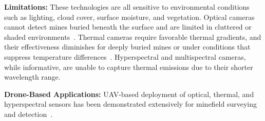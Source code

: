 \textbf{Limitations:} These technologies are all sensitive to environmental conditions such as lighting, cloud cover, surface moisture, and vegetation. Optical cameras cannot detect mines buried beneath the surface and are limited in cluttered or shaded environments~\cite{cardonalandmine}. Thermal cameras require favorable thermal gradients, and their effectiveness diminishes for deeply buried mines or under conditions that suppress temperature differences~\cite{Kovcs2022LandmineDW}. Hyperspectral and multispectral cameras, while informative, are unable to capture thermal emissions due to their shorter wavelength range.

\textbf{Drone-Based Applications:} UAV-based deployment of optical, thermal, and hyperspectral sensors has been demonstrated extensively for minefield surveying and detection~\cite{dena2020image,7529819,Schutte2001ARCAC,10.1117/12.2177182,Popov2022MethodFM,Desmet2018DronesA,rs15040967,10.1117/12.720442,Baur2021HowTI,baur2020applying,Stankevich2024OpticalAM,AgrawalChung2024ComparingSL,bajic2017developing,10765909,6842242,rs16040677,rs16122046,qiu2023joint,guo2022uav,ptsa-qj43-23,TENORIOTAMAYO2023109443,nikulin2018detection,FORERORAMIREZ2022104307,TENORIOTAMAYO2024105567,krause2018diurnal,Fardoulis2020PROOFHS,butt2024uav}.

